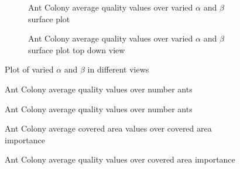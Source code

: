 \begin{figure}[H]
	\centering
	\begin{subfigure}{0.48\textwidth}
		
		\caption{Ant Colony average quality values over varied $\alpha$ and $\beta$ surface plot}
		\label{fig:antColonyCasesAlphaAndBetaVariedSurfaceAvg}
	\end{subfigure}
	\hfill
	\begin{subfigure}{0.48\textwidth}
		
		\caption{Ant Colony average quality values over varied $\alpha$ and $\beta$ surface plot top down view}
		\label{fig:antColonyCasesAlphaAndBetaVariedSurfaceAvgTopDown}
	\end{subfigure}
	\caption{Plot of varied $\alpha$ and $\beta$ in different views}
	\label{fig:antColonyCasesAlphaAndBetaVariedAvgAll}
\end{figure}




\begin{figure}[H]
	\centering
	
	\caption{Ant Colony average quality values over number ants}
	\label{fig:AntColonyQualityAntsAll}
\end{figure}



\begin{figure}[H]
	\centering
	
	\caption{Ant Colony average quality values over number ants}
	\label{fig:AntColonyQualityAntsAvg}
\end{figure}





\begin{figure}[H]
	\centering
	
	\caption{Ant Colony average covered area values over covered area importance}
	\label{fig:AntColonyAreaAvg}
\end{figure}



\begin{figure}[H]
	\centering
	
	\caption{Ant Colony average quality values over covered area importance}
	\label{fig:AntColonyAreaQualityAvg}
\end{figure}






